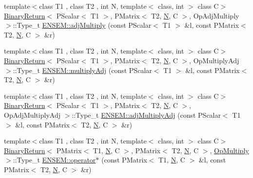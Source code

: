 \begin{DoxyCompactItemize}
\item 
{\footnotesize template$<$class T1 , class T2 , int N, template$<$ class, int $>$ class C$>$ }\\\mbox{\hyperlink{structBinaryReturn}{Binary\+Return}}$<$ P\+Scalar$<$ T1 $>$, P\+Matrix$<$ T2, \mbox{\hyperlink{adat__devel_2lib_2hadron_2operator__name__util_8cc_a7722c8ecbb62d99aee7ce68b1752f337}{N}}, C $>$, Op\+Adj\+Multiply $>$\+::Type\+\_\+t \mbox{\hyperlink{group__primmatrix_ga01de3db0f09195f592339c9241bd4692}{E\+N\+S\+E\+M\+::adj\+Multiply}} (const P\+Scalar$<$ T1 $>$ \&l, const P\+Matrix$<$ T2, \mbox{\hyperlink{adat__devel_2lib_2hadron_2operator__name__util_8cc_a7722c8ecbb62d99aee7ce68b1752f337}{N}}, C $>$ \&r)
\item 
{\footnotesize template$<$class T1 , class T2 , int N, template$<$ class, int $>$ class C$>$ }\\\mbox{\hyperlink{structBinaryReturn}{Binary\+Return}}$<$ P\+Scalar$<$ T1 $>$, P\+Matrix$<$ T2, \mbox{\hyperlink{adat__devel_2lib_2hadron_2operator__name__util_8cc_a7722c8ecbb62d99aee7ce68b1752f337}{N}}, C $>$, Op\+Multiply\+Adj $>$\+::Type\+\_\+t \mbox{\hyperlink{group__primmatrix_ga500e40c33d8e7e4a2a95970fb8a56326}{E\+N\+S\+E\+M\+::multiply\+Adj}} (const P\+Scalar$<$ T1 $>$ \&l, const P\+Matrix$<$ T2, \mbox{\hyperlink{adat__devel_2lib_2hadron_2operator__name__util_8cc_a7722c8ecbb62d99aee7ce68b1752f337}{N}}, C $>$ \&r)
\item 
{\footnotesize template$<$class T1 , class T2 , int N, template$<$ class, int $>$ class C$>$ }\\\mbox{\hyperlink{structBinaryReturn}{Binary\+Return}}$<$ P\+Scalar$<$ T1 $>$, P\+Matrix$<$ T2, \mbox{\hyperlink{adat__devel_2lib_2hadron_2operator__name__util_8cc_a7722c8ecbb62d99aee7ce68b1752f337}{N}}, C $>$, Op\+Adj\+Multiply\+Adj $>$\+::Type\+\_\+t \mbox{\hyperlink{group__primmatrix_ga5b52c2e633a016e706b74e388b8af102}{E\+N\+S\+E\+M\+::adj\+Multiply\+Adj}} (const P\+Scalar$<$ T1 $>$ \&l, const P\+Matrix$<$ T2, \mbox{\hyperlink{adat__devel_2lib_2hadron_2operator__name__util_8cc_a7722c8ecbb62d99aee7ce68b1752f337}{N}}, C $>$ \&r)
\item 
{\footnotesize template$<$class T1 , class T2 , int N, template$<$ class, int $>$ class C$>$ }\\\mbox{\hyperlink{structBinaryReturn}{Binary\+Return}}$<$ P\+Matrix$<$ T1, \mbox{\hyperlink{adat__devel_2lib_2hadron_2operator__name__util_8cc_a7722c8ecbb62d99aee7ce68b1752f337}{N}}, C $>$, P\+Matrix$<$ T2, \mbox{\hyperlink{adat__devel_2lib_2hadron_2operator__name__util_8cc_a7722c8ecbb62d99aee7ce68b1752f337}{N}}, C $>$, \mbox{\hyperlink{structOpMultiply}{Op\+Multiply}} $>$\+::Type\+\_\+t \mbox{\hyperlink{group__primmatrix_ga8f46104c9d9d10301141fdd1c0546a36}{E\+N\+S\+E\+M\+::operator$\ast$}} (const P\+Matrix$<$ T1, \mbox{\hyperlink{adat__devel_2lib_2hadron_2operator__name__util_8cc_a7722c8ecbb62d99aee7ce68b1752f337}{N}}, C $>$ \&l, const P\+Matrix$<$ T2, \mbox{\hyperlink{adat__devel_2lib_2hadron_2operator__name__util_8cc_a7722c8ecbb62d99aee7ce68b1752f337}{N}}, C $>$ \&r)

\end{DoxyCompactItemize}
